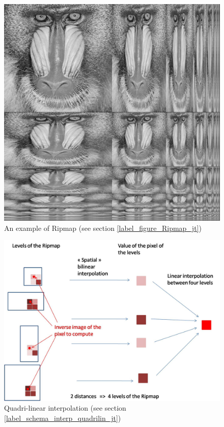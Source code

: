 

\label{label_figure_Ripmap_jt}
\begin{figure}[h!]
\centering
\includegraphics[scale=0.4]{Ripmap_real}
\caption{An example of Ripmap (see section \ref{label_figure_Ripmap_jt})}
\label{Ripmap_real}
\end{figure}


\label{label_schema_interp_quadrilin_jt}
\begin{figure}[h!]
\centering
\includegraphics[scale=0.5]{interbibilineaire.jpg}
\caption{Quadri-linear interpolation (see section \ref{label_schema_interp_quadrilin_jt})}
\label{interbibilineaire}
\end{figure}

